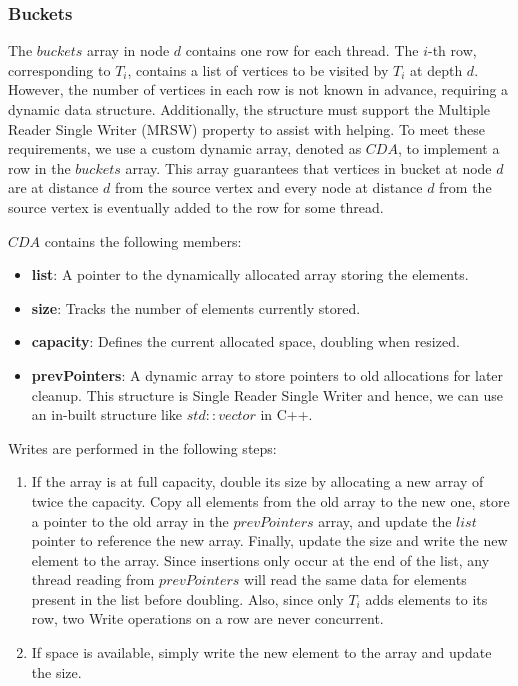 \subsubsection{Buckets}

The $buckets$ array in node $d$ contains one row for each thread. The $i$-th row, corresponding to $T_i$, contains a list of vertices to be visited by $T_i$ at depth $d$. However, the number of vertices in each row is not known in advance, requiring a dynamic data structure. Additionally, the structure must support the Multiple Reader Single Writer (MRSW) property to assist with helping. To meet these requirements, we use a custom dynamic array, denoted as $CDA$, to implement a row in the $buckets$ array. This array guarantees that vertices in bucket at node $d$ are at distance $d$ from the source vertex and every node at distance $d$ from the source vertex is eventually added to the row for some thread. 

$CDA$ contains the following members:
\begin{itemize}
    \item \textbf{list}: A pointer to the dynamically allocated array storing the elements.
    \item \textbf{size}: Tracks the number of elements currently stored.
    \item \textbf{capacity}: Defines the current allocated space, doubling when resized.
    \item \textbf{prevPointers}: A dynamic array to store pointers to old allocations for later cleanup. This structure is Single Reader Single Writer and hence, we can use an in-built structure like $std::vector$ in C++.
\end{itemize}

Writes are performed in the following steps:
\begin{enumerate}
    \item If the array is at full capacity, double its size by allocating a new array of twice the capacity. Copy all elements from the old array to the new one, store a pointer to the old array in the $prevPointers$ array, and update the $list$ pointer to reference the new array. Finally, update the size and write the new element to the array. Since insertions only occur at the end of the list, any thread reading from $prevPointers$ will read the same data for elements present in the list before doubling. Also, since only $T_i$ adds elements to its row, two Write operations on a row are never concurrent. 
    \item If space is available, simply write the new element to the array and update the size.
\end{enumerate}

